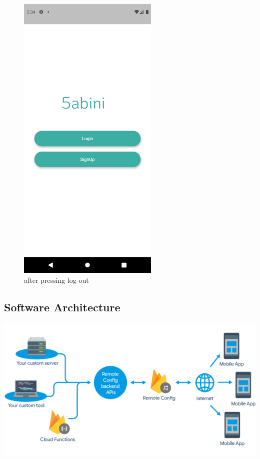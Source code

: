 \documentclass[12pt]{article}
\begin{document}
    \begin{figure}[h!]
\centerline{\includegraphics[width=0.6\textwidth]{./Screenshots/1.PNG}}
  \caption{after pressing log-out}
  \end{figure}



\clearpage
\subsection{Software Architecture}
\centerline{\includegraphics[width=1.1\textwidth]{./SoftwareArch/SoftwareArch.PNG}}
\end{document}
